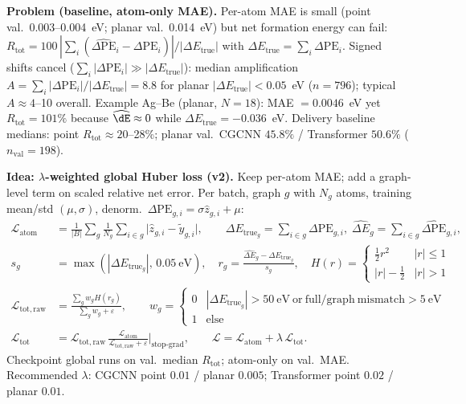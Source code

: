 \documentclass[10pt,a4paper]{article}
\newcommand{\dPE}{\Delta\mathrm{PE}}
\newcommand{\dEtrue}{\Delta E_{\mathrm{true}}}
\begin{document}
\noindent\textbf{Problem (baseline, atom-only MAE).}
Per-atom MAE is small (point val.\ 0.003--0.004~eV; planar val.\ 0.014~eV) but net formation energy can fail: $R_{\mathrm{tot}}=100\,|\sum_i(\widehat{\dPE}_i-\dPE_i)|/|\dEtrue|$ with $\dEtrue=\sum_i\dPE_i$.
Signed shifts cancel ($\sum_i|\dPE_i|\gg|\dEtrue|$): median amplification $A=\sum_i|\dPE_i|/|\dEtrue|=8.8$ for planar $|\dEtrue|<0.05$~eV ($n=796$); typical $A\approx 4$--10 overall.
Example Ag--Be (planar, $N=18$): MAE $=0.0046$~eV yet $R_{\mathrm{tot}}=101\%$ because $\widehat{\dE}\approx 0$ while $\dEtrue=-0.036$~eV.
Delivery baseline medians: point $R_{\mathrm{tot}}\approx 20$--28\%; planar val.\ CGCNN $45.8\%$ / Transformer $50.6\%$ ($n_{\mathrm{val}}=198$).

\medskip
\noindent\textbf{Idea: $\lambda$-weighted global Huber loss (v2).}
Keep per-atom MAE; add a graph-level term on scaled relative net error.
Per batch, graph $g$ with $N_g$ atoms, training mean/std $(\mu,\sigma)$, denorm.\ $\widehat{\dPE}_{g,i}=\sigma\hat z_{g,i}+\mu$:
\begin{align*}
  \mathcal{L}_{\mathrm{atom}}
  &= \frac{1}{|B|}\sum_g \frac{1}{N_g}\sum_{i\in g}\bigl|\hat z_{g,i}-\tilde y_{g,i}\bigr|,
  \qquad
  \dEtrue_g=\sum_{i\in g}\dPE_{g,i},\;
  \widehat{\Delta E}_g=\sum_{i\in g}\widehat{\dPE}_{g,i},\\
  s_g &= \max(|\dEtrue_g|,\,0.05~\mathrm{eV}),\quad
  r_g=\frac{\widehat{\Delta E}_g-\dEtrue_g}{s_g},\quad
  H(r)=
  \begin{cases}
    \tfrac12 r^2 & |r|\le 1\\
    |r|-\tfrac12 & |r|>1
  \end{cases}\\
  \mathcal{L}_{\mathrm{tot,raw}}
  &= \frac{\sum_g w_g H(r_g)}{\sum_g w_g+\varepsilon},
  \qquad
  w_g=
  \begin{cases}
    0 & |\dEtrue_g|>50~\mathrm{eV}\ \mathrm{or\ full/graph\ mismatch}>5~\mathrm{eV}\\
    1 & \mathrm{else}
  \end{cases}\\
  \mathcal{L}_{\mathrm{tot}}
  &= \mathcal{L}_{\mathrm{tot,raw}}\,
    \frac{\mathcal{L}_{\mathrm{atom}}}{\mathcal{L}_{\mathrm{tot,raw}}+\varepsilon}\Big|_{\mathrm{stop\text{-}grad}},\qquad
  \boxed{\mathcal{L}=\mathcal{L}_{\mathrm{atom}}+\lambda\,\mathcal{L}_{\mathrm{tot}}}.
\end{align*}
Checkpoint global runs on val.\ median $R_{\mathrm{tot}}$; atom-only on val.\ MAE.
Recommended $\lambda$: CGCNN point $0.01$ / planar $0.005$; Transformer point $0.02$ / planar $0.01$.
\end{document}
